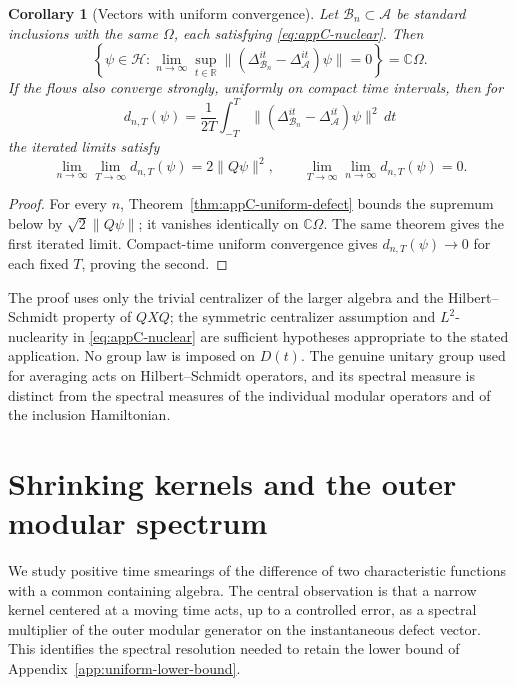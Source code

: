\documentclass[a4paper,11pt]{article}
\newtheorem{corollary}[theorem]{Corollary}
\theoremstyle{definition}
\begin{document}
\begin{corollary}[Vectors with uniform convergence]\label{cor:appC-uniform-subspace}
Let $\mathcal B_n\subset\mathcal A$ be standard inclusions with the same $\Omega$, each satisfying \eqref{eq:appC-nuclear}. Then
\begin{equation}
 \left\{\psi\in\mathcal H:
 \lim_{n\to\infty}\sup_{t\in\mathbb R}
 \|(\Delta_{\mathcal B_n}^{it}-\Delta_{\mathcal A}^{it})\psi\|=0\right\}
 =\mathbb C\Omega .
 \label{eq:appC-uniform-subspace}
\end{equation}
If the flows also converge strongly, uniformly on compact time intervals, then for
\[
 d_{n,T}(\psi)=\frac1{2T}\int_{-T}^{T}
 \|(\Delta_{\mathcal B_n}^{it}-\Delta_{\mathcal A}^{it})\psi\|^2\,dt
\]
the iterated limits satisfy
\begin{equation}
 \lim_{n\to\infty}\lim_{T\to\infty}d_{n,T}(\psi)=2\|Q\psi\|^2,
 \qquad
 \lim_{T\to\infty}\lim_{n\to\infty}d_{n,T}(\psi)=0 .
 \label{eq:appC-order-of-limits}
\end{equation}
\end{corollary}

\begin{proof}
For every $n$, Theorem~\ref{thm:appC-uniform-defect} bounds the supremum below by $\sqrt2\|Q\psi\|$; it vanishes identically on $\mathbb C\Omega$. The same theorem gives the first iterated limit. Compact-time uniform convergence gives $d_{n,T}(\psi)\to0$ for each fixed $T$, proving the second.
\end{proof}

The proof uses only the trivial centralizer of the larger algebra and the Hilbert--Schmidt property of $QXQ$; the symmetric centralizer assumption and $L^2$-nuclearity in \eqref{eq:appC-nuclear} are sufficient hypotheses appropriate to the stated application. No group law is imposed on $D(t)$. The genuine unitary group used for averaging acts on Hilbert--Schmidt operators, and its spectral measure is distinct from the spectral measures of the individual modular operators and of the inclusion Hamiltonian.

\section{Shrinking kernels and the outer modular spectrum}
\label{app:shrinking-kernels}

We study positive time smearings of the difference of two characteristic functions with a common containing algebra. The central observation is that a narrow kernel centered at a moving time acts, up to a controlled error, as a spectral multiplier of the outer modular generator on the instantaneous defect vector. This identifies the spectral resolution needed to retain the lower bound of Appendix~\ref{app:uniform-lower-bound}.
\end{document}
